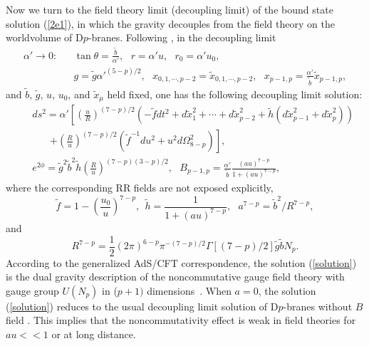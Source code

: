 \documentclass[a4paper,12pt]{article}
\begin{document}
Now we turn to the field theory limit (decoupling limit) of the bound state
solution (\ref{2e1}), in which the gravity decouples from the field theory
on the worldvolume of D$p$-branes. Following \cite{Mald1,Ali,Lu},
in the decoupling limit
\begin{eqnarray}
\alpha' \rightarrow 0:&& \tan\theta =\frac{\tilde{b}}{\alpha'},
 \ \ \ r=\alpha' u, \ \ \ r_0=\alpha'u_0, \nonumber \\
\label{decoupling}
&& g=\tilde{g}\alpha'^{(5-p)/2},\ \ \ x_{0,1,\cdots,p-2}
  =\tilde{x}_{0,1,\cdots,p-2},\ \ \
     x_{p-1,p}= \frac{\alpha'}{\tilde{b}}\tilde{x}_{p-1,p},
\end{eqnarray}
and $\tilde{b}$, $\tilde{g}$, $u$, $u_0$, and $\tilde{x}_{\mu}$
held fixed, one has the following decoupling limit solution:
\begin{eqnarray}
&& ds^2=\alpha'\left [\left(\frac{u}{R}\right)^{(7-p)/2}\left (-\tilde{f}
    dt^2 +d\tilde{x}_1^2 +\cdots +d\tilde{x}_{p-2}^2
    +\tilde{h}(d\tilde{x}_{p-1}^2 +d\tilde{x}_p^2)\right)
     \right. \nonumber \\
&&~~~~~~~~\left. +\left(\frac{R}{u}\right)^{(7-p)/2}
       \left(\tilde{f}^{-1}du^2
  +u^2 d\Omega^2_{8-p}\right)\right], \nonumber\\
\label{solution}
&& e^{2\phi} = \tilde{g}^2\tilde{b}^2 \tilde{h}\left(\frac{R}{u}
  \right)^{(7-p)(3-p)/2}, \ \ \ B_{p-1,p}
 = \frac{\alpha'}{\tilde{b}}\frac{(au)^{7-p}}{1+(au)^{7-p}},
\end{eqnarray}
where the corresponding RR fields are not exposed explicitly,
\begin{equation}
\tilde{f} = 1 - \left(\frac{u_0}{u}\right)^{7-p},\ \ \tilde{h} = \frac{1}
   {1+(au)^{7-p}}, \ \ \ a^{7-p} = \tilde{b}^2/R^{7-p},
\label{fha}
\end{equation}
and
\begin{equation}
\label{R}
R^{7-p} = \frac{1}{2}(2\pi)^{6-p}\pi^{-(7-p)/2}\Gamma[(7-p)/2]\tilde{g}
  \tilde{b} N_p.
\end{equation}
According to the generalized AdS/CFT correspondence, the solution
(\ref{solution}) is  the dual gravity description
of the noncommutative gauge field theory with gauge group $U(N_p)$ in
($p+1)$ dimensions~\cite{Hashimoto1,Mald1,Ali,Bar,Harmark}. When $a=0$, the
solution (\ref{solution}) reduces to the usual decoupling limit solution of
D$p$-branes without $B$ field \cite{Itzhaki}. This implies that the
noncommutativity effect is weak in field theories for $au<<1$ or at long
distance.
\end{document}
